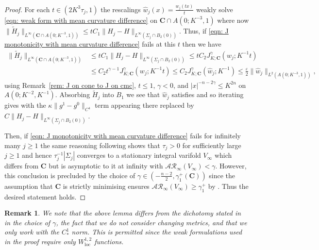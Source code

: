 \documentclass[12pt]{article}
\newtheorem{remark}{Remark}
\begin{document}
\begin{proof}
    \bigskip

    For each $t \in (2K^3\tau_j,1)$ the rescalings $\hat{w}_j(x) = \frac{w_j(tx)}{t}$ weakly solve \eqref{eqn: weak form with mean curvature difference} on $\mathbf{C} \cap A(0;K^{-3},1)$ where now $\|\widetilde{H}_j\|_{L^\infty(\mathbf{C} \cap A(0;K^{-3},1))} \leq t C_1 \|H_j - H\|_{L^\infty(\Sigma_j \cap B_2(0))}$. Thus, if \eqref{eqn: J monotonicity with mean curvature difference} fails at this $t$ then we have
    \begin{align*}
        \|\widetilde H_j\|_{L^\infty(\mathbf C\cap A(0;K^{-3},1))}&\leq tC_1\|H_j - H\|_{L^\infty(\Sigma_j \cap B_2(0))}
        \leq tC_2 J^\gamma_{K;\mathbf C}( w_j;K^{-1}t )\\
        &\le C_2 t^{\gamma-1} J^\gamma_{K;\mathbf C}(w_j;K^{-1}t) \leq C_2 J^\gamma_{K;\mathbf C}(\hat w_j;K^{-1})\leq \frac{\varepsilon}{2}\|\hat w_j\|_{L^2(A(0;K^{-3},1))},
    \end{align*} 
    using Remark~\ref{rem: J on cone to J on cmc}, $t\le1$, $\gamma<0$, and $|x|^{-n-2\gamma}\le K^{2n}$ on $A(0;K^{-2},K^{-1})$. Absorbing $\widetilde H_j$ into $B_1$ we see that $\hat w_j$ satisfies \cite[(33)–(34)]{LW25} and so iterating \cite[Corollary 6.2]{LW25} gives \cite[(F.15)]{LW25} with the $\kappa\|g^1-g^0\|_{C^4}$ term appearing there replaced by $C\|H_j - H\|_{L^\infty(\Sigma_j \cap B_2(0))}$.

    \bigskip
    
    Then, if \eqref{eqn: J monotonicity with mean curvature difference} fails for infinitely many $j \geq 1$ the same reasoning following \cite[(F.15)]{LW25} shows that $\tau_j > 0$ for sufficiently large $j \geq 1$ and hence $\tau_j^{-1}|\Sigma_j|$ converges to a stationary integral varifold $V_\infty$ which differs from $\mathbf{C}$ but is asymptotic to it at infinity with $\mathcal{AR}_\infty(V_\infty) < \gamma$. However, this conclusion is precluded by the choice of $\gamma \in (-\frac{n-2}{2}, \gamma_1^+(\mathbf{C}))$ since the assumption that $\mathbf{C}$ is strictly minimising ensures $\mathcal{AR}_\infty(V_\infty) \geq \gamma_1^+$ by \cite[
    Theorem 4.5(1)]{W20}. Thus the desired statement holds. 
\end{proof}

\begin{remark}
    We note that the above lemma differs from the dichotomy stated in \cite[Appendix A]{MNP25} in the choice of $\gamma$, the fact that we do not consider changing metrics, and that we only work with the $C^1_*$ norm. This is permitted since the weak formulations used in the proof require only $W^{1,2}_\mathrm{loc}$ functions. 
\end{remark}
\end{document}
